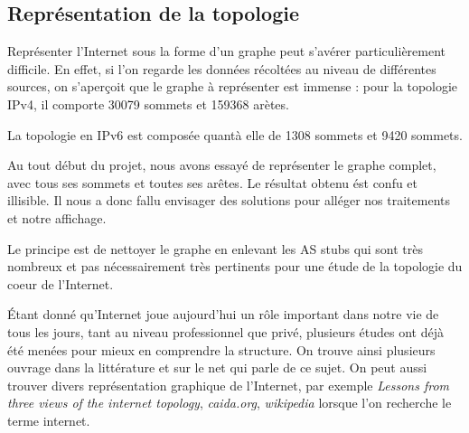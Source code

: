 
% 

\subsection{Repr\'esentation de la topologie}

Repr\'esenter l'Internet sous la forme d'un graphe peut s'av\'erer particulièrement difficile. En effet, si l'on regarde les donn\'ees r\'ecolt\'ees au niveau de diff\'erentes sources, on s'aperçoit que le graphe \`a repr\'esenter est immense : pour la topologie IPv4, il comporte 30079 sommets et 159368 ar\`etes.
\par
La topologie en IPv6 est compos\'ee quant\`a elle de 1308 sommets et 9420 sommets.

\par
Au tout d\'ebut du projet, nous avons essayé de repr\'esenter le graphe complet, avec tous ses sommets et toutes ses ar\^etes. Le r\'esultat obtenu \'est confu et illisible. Il nous a donc fallu envisager des solutions pour all\'eger nos traitements et notre affichage.
\par
Le principe est de nettoyer le graphe en enlevant les AS stubs qui sont tr\`es nombreux et pas nécessairement tr\`es pertinents pour une \'etude de la topologie du coeur de l'Internet. 
\par
\'Etant donn\'e qu'Internet joue aujourd'hui un r\^ole important dans notre vie de tous les jours, tant au niveau professionnel que priv\'e, plusieurs \'etudes ont d\'ej\`a \'et\'e men\'ees pour mieux en comprendre la structure.
On trouve ainsi plusieurs ouvrage dans la litt\'erature et sur le net qui parle de ce sujet. On peut aussi trouver divers repr\'esentation graphique de l'Internet, par exemple \textit{Lessons from three views of the internet topology}, \textit{caida.org}, \textit{wikipedia} lorsque l'on recherche le terme internet.

%